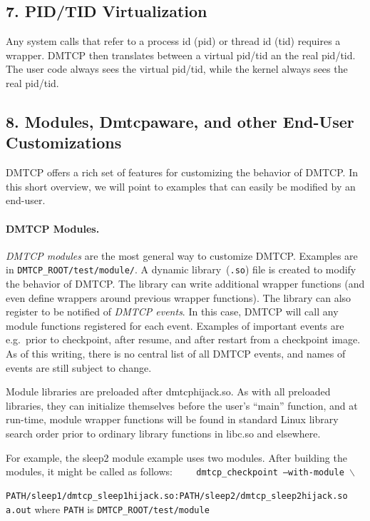 \documentclass{article}
\begin{document}
\subsection*{7. PID/TID Virtualization}

Any system calls that refer to a process id (pid) or thread id (tid) requires
a wrapper.  DMTCP then translates between a virtual pid/tid an the
real pid/tid.  The user code always sees the virtual pid/tid, while
the kernel always sees the real pid/tid.

\newpage

\subsection*{8. Modules, Dmtcpaware, and other End-User Customizations}

DMTCP offers a rich set of features for customizing the behavior of
DMTCP.  In this short overview, we will point to examples that can
easily be modified by an end-user.

\paragraph{DMTCP Modules.}

{\em DMTCP modules\/} are the most general way to customize DMTCP.  Examples
are in {\tt DMTCP\_ROOT/test/module/}.  A dynamic library~({\tt *.so})
file is created to modify the behavior of DMTCP.  The library can
write additional wrapper functions (and even define wrappers around
previous wrapper functions).  The library can also register
to be notified of {\em DMTCP events}.  In this case, DMTCP will
call any module functions registered for each event.
Examples of important events are
\hbox{e.g.}~prior to checkpoint, after resume, and after restart
from a checkpoint image.  As of this writing, there is no central
list of all DMTCP events, and names of events are still subject to change.

Module libraries are preloaded after dmtcphijack.so.  As with all
preloaded libraries, they can initialize themselves before the user's
``main'' function, and at run-time, module wrapper functions will
be found in standard Linux library search order prior to ordinary
library functions in libc.so and elsewhere.

For example, the sleep2 module example uses two modules.  After building
the modules, it might be called as follows: \newline
{\tt
\hbox{\ \ }  dmtcp\_checkpoint --with-module $\backslash$ \newline
\hbox{\ \ \ \ }
 PATH/sleep1/dmtcp\_sleep1hijack.so:PATH/sleep2/dmtcp\_sleep2hijack.so a.out}
 \newline
where {\tt PATH} is {\tt DMTCP\_ROOT/test/module}
\end{document}
